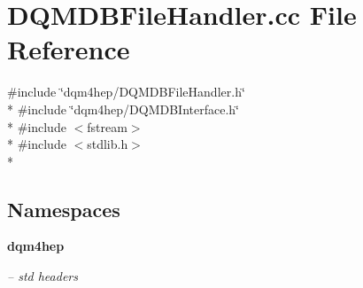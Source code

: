 \section{D\+Q\+M\+D\+B\+File\+Handler.\+cc File Reference}
\label{DQMDBFileHandler_8cc}
{\ttfamily \#include \char`\"{}dqm4hep/\+D\+Q\+M\+D\+B\+File\+Handler.\+h\char`\"{}}\\*
{\ttfamily \#include \char`\"{}dqm4hep/\+D\+Q\+M\+D\+B\+Interface.\+h\char`\"{}}\\*
{\ttfamily \#include $<$fstream$>$}\\*
{\ttfamily \#include $<$stdlib.\+h$>$}\\*
\subsection*{Namespaces}
\begin{DoxyCompactItemize}
\item 
 {\bf dqm4hep}
\begin{DoxyCompactList}\small\item\em -- std headers \end{DoxyCompactList}\end{DoxyCompactItemize}
